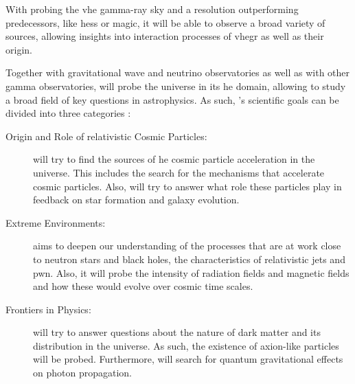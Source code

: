 With \cta{} probing the \gls{vhe} gamma-ray sky and a resolution outperforming predecessors, like
\gls{hess} or \gls{magic}, it will be able to observe a broad variety of sources, allowing insights
into interaction processes of \gls{vhegr} as well as their origin.

Together with gravitational wave and neutrino observatories as well as with other gamma observatories,
\cta{} will probe the universe in its \gls{he} domain, allowing to study a broad field of key questions
in astrophysics. As such, \cta's scientific goals can be divided into three categories \cite{cta_scientific_goals}:
\begin{description}
    \item [Origin and Role of relativistic Cosmic Particles:] \cta{} will try to find the sources of
    \gls{he} cosmic particle acceleration in the universe. This includes the search for the mechanisms
    that accelerate cosmic particles. Also, \cta{} will try to answer what role these particles play
    in feedback on star formation and galaxy evolution.
    \item [Extreme Environments:] \cta{} aims to deepen our understanding of the processes that
    are at work close to neutron stars and black holes, the characteristics of relativistic jets and
    \gls{pwn}. Also, it will probe the intensity of radiation fields and magnetic fields and how these
    would evolve over cosmic time scales.
    \item [Frontiers in Physics:] \cta{} will try to answer questions about the nature of dark matter
    and its distribution in the universe. As such, the existence of axion-like particles will be
    probed. Furthermore, \cta{} will search for quantum gravitational effects on photon propagation.
\end{description}

